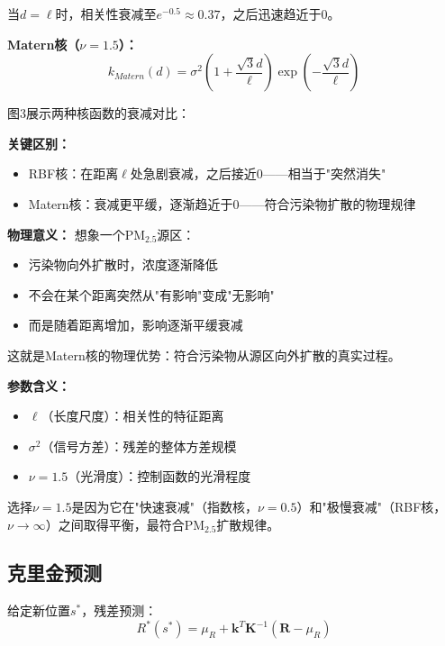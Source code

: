 \documentclass[UTF8, a4paper, 12pt]{article}
\begin{document}
当$d = \ell$时，相关性衰减至$e^{-0.5} \approx 0.37$，之后迅速趋近于0。

\textbf{Matern核（$\nu=1.5$）：}
\begin{equation}
k_{Matern}(d) = \sigma^2 \left(1 + \frac{\sqrt{3}d}{\ell}\right) \exp\left(-\frac{\sqrt{3}d}{\ell}\right)
\end{equation}

图3展示两种核函数的衰减对比：

\begin{figure}[htbp]
\centering
{}
\end{figure}

\textbf{关键区别：}
\begin{itemize}
    \item RBF核：在距离$\ell$处急剧衰减，之后接近0——相当于"突然消失"
    \item Matern核：衰减更平缓，逐渐趋近于0——符合污染物扩散的物理规律
\end{itemize}

\textbf{物理意义：} 想象一个PM$_{2.5}$源区：
\begin{itemize}
    \item 污染物向外扩散时，浓度逐渐降低
    \item 不会在某个距离突然从"有影响"变成"无影响"
    \item 而是随着距离增加，影响逐渐平缓衰减
\end{itemize}

这就是Matern核的物理优势：符合污染物从源区向外扩散的真实过程。

\textbf{参数含义：}
\begin{itemize}
    \item $\ell$（长度尺度）：相关性的特征距离
    \item $\sigma^2$（信号方差）：残差的整体方差规模
    \item $\nu=1.5$（光滑度）：控制函数的光滑程度
\end{itemize}

选择$\nu=1.5$是因为它在"快速衰减"（指数核，$\nu=0.5$）和"极慢衰减"（RBF核，$\nu \to \infty$）之间取得平衡，最符合PM$_{2.5}$扩散规律。

\subsection{克里金预测}

给定新位置$s^*$，残差预测：
\begin{equation}
R^*(s^*) = \mu_R + \mathbf{k}^T \mathbf{K}^{-1} (\mathbf{R} - \mu_R)
\end{equation}
\end{document}
